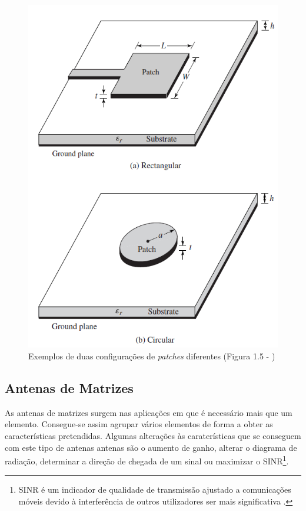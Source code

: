 \begin{figure}[h]
\centering
\includegraphics[scale=0.6]{chapters/ch3/assets/microstrip}
\decoRule
\caption[Antena \textit{Microstrip}]{Exemplos de duas configurações de \textit{patches} diferentes (Figura 1.5 - \cite{Balanis2016})}
\label{fig:microstrip}
\end{figure}

\subsection*{Antenas de Matrizes}
As antenas de matrizes surgem nas aplicações em que é necessário mais que um elemento. Consegue-se assim agrupar vários elementos de forma a obter as características pretendidas. Algumas alterações às caraterísticas que se conseguem com este tipo de antenas antenas são o aumento de ganho, alterar o diagrama de radiação, determinar a direção de chegada de um sinal ou maximizar o \gls{SINR}\footnote{\gls{SINR} é um indicador de qualidade de transmissão ajustado a comunicações móveis devido à interferência de outros utilizadores ser mais significativa \parencite{Jeske2004}.}.

